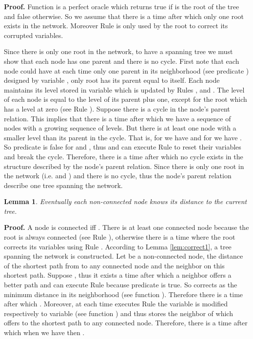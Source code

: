 \documentclass[11pt]{article}
\newtheorem{lemma}{Lemma}
\newenvironment{proof}{\noindent \begin{rm}{\textbf{Proof.} }}{\hspace*{\fill}\par\end{rm} \vspace{.3cm}}
\newcommand{\ARA}{}
\newcommand{\ARB}{}
\newcommand{\CRA}{}
\begin{document}
\begin{proof}
Function  is a perfect oracle which returns true if 
is the root of the tree and false otherwise. So we assume that there
is a time after which only one root exists in the network. Moreover
Rule \CRA\/ is only used by the root to correct its corrupted variables.

Since there is only one root in the network, to have a spanning tree
we must show that each node has one parent and there is no
cycle. First note that each node  could have at each time only one
parent in its neighborhood (see predicate ) designed by
variable , only root has its parent equal to itself. Each
node maintains its level stored in variable  which is updated
by Rules \CRA\/, \ARA\/ and \ARB\/. The level of each node is equal to the level
of its parent plus one, except for the root which has a level at zero
(see Rule \CRA\/). Suppose there is a cycle in the node's parent
relation. This implies that there is a time after which we have a
sequence of nodes with a growing sequence of levels. But there is at
least one node  with a smaller level than its parent  in the
cycle. That is, for  we have  and for 
we have . So predicate
 is false for  and , thus  and  can execute Rule \ARA\/
to reset their variables and break the cycle. Therefore, there is a
time after which no cycle exists in the structure described by the
node's parent relation. Since there is only one root in the network
(i.e.  and ) and there is no cycle, thus the
node's parent relation describe one tree spanning the network.
\end{proof}


\begin{lemma}
\label{lem:correct1bis}
Eventually each non-connected node knows its distance to the current tree.
\end{lemma}

\begin{proof}
A node  is connected iff . There is at least one
connected node because the root is always connected (see Rule \CRA\/),
otherwise there is a time where the root corrects its variables using
Rule \CRA\/. According to Lemma \ref{lem:correct1}, a tree spanning the
network is constructed. Let  be a non-connected node,  the
distance of the shortest path from  to any connected node and 
the neighbor on this shortest path. Suppose , thus it
exists a time after which a neighbor offers a better path and  can
execute Rule \ARA\/ because predicate  is true. So 
corrects  as the minimum distance in its neighborhood (see
function ). Therefore there is a time after which
. Moreover, at each time  executes Rule \ARA\/ the variable
 is modified respectively to variable  (see function
) and thus  stores the neighbor of 
which offers to  the shortest path to any connected
node. Therefore, there is a time after which when we have 
then .
\end{proof}
\end{document}
